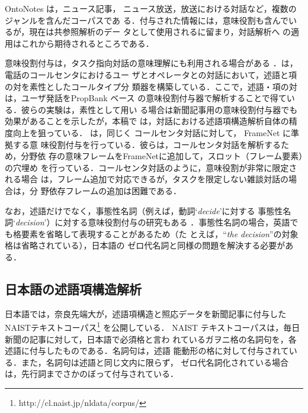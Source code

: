 \documentclass[japanese]{jnlp_1.4}
\begin{document}
OntoNotes \cite{hovy-EtAl:2006:HLT-NAACL06-Short} は，ニュース記事，
ニュース放送，放送における対話など，複数のジャンルを含んだコーパスであ
る．付与された情報には，意味役割も含んでいるが，現在は共参照解析のデー
タとして使用されるに留まり\cite{conll2012-shared-task}，対話解析へ
の適用はこれから期待されるところである．

意味役割付与は，タスク指向対話の意味理解にも利用される場合がある
\cite{Tur:UnderstandingSRL2005,coppola-moschitti-riccardi:2009:NAACLHLT09-Short}
．は，電話のコールセンタにおけるユー
ザとオペレータとの対話において，述語と項の対を素性としたコールタイプ分
類器を構築している．ここで，述語・項の対は，ユーザ発話をPropBank ベース
の意味役割付与器で解析することで得ている．彼らの実験は，素性として用い
る場合は新聞記事用の意味役割付与器でも効果があることを示したが，本稿で
は，対話における述語項構造解析自体の精度向上を狙っている．
は，同じく
コールセンタ対話に対して，
FrameNet \cite{RuppenhoferEtAl2006:ExtTeoryAndPractice}に準拠する意
味役割付与を行っている．彼らは，コールセンタ対話を解析するため，分野依
存の意味フレームをFrameNetに追加して，スロット（フレーム要素）の穴埋め
を行っている．コールセンタ対話のように，意味役割が非常に限定される場合
は，フレーム追加で対応できるが，タスクを限定しない雑談対話の場合は，分
野依存フレームの追加は困難である．

なお，述語だけでなく，事態性名詞（例えば，動詞`\textit{decide}'に対する
事態性名詞`\textit{decision}'）に対する意味役割付与の研究もある
\cite{jiang-ng:2006:EMNLP,Gerber:NomPredArgs2012,laparra-rigau:2013:ACL2013}
．事態性名詞の場合，英語でも格要素を省略して表現することがあるため（た
とえば，``\textit{the decision}''の対象格は省略されている），日本語の
ゼロ代名詞と同様の問題を解決する必要がある．


\subsection{日本語の述語項構造解析}

日本語では，奈良先端大が，述語項構造と照応データを新聞記事に付与した
NAISTテキストコーパス\footnote{http://cl.naist.jp/nldata/corpus/}
を公開している\cite{iida-EtAl:2007:LAW,Iida:NAISTCorpus2010j}．
NAIST テキストコーパスは，毎日新聞の記事に対して，日本語で必須格と言わ
れているガヲニ格の名詞句を，各述語に付与したものである．名詞句は，述語
能動形の格に対して付与されている．また，名詞句は述語と同じ文内に限らず，
ゼロ代名詞化されている場合は，先行詞までさかのぼって付与されている．
\end{document}
